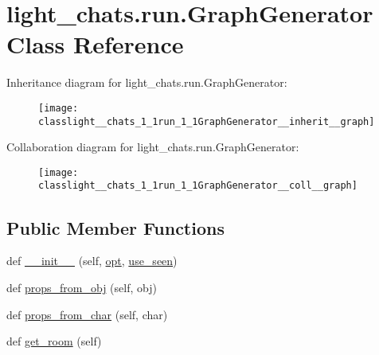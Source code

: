 \hypertarget{classlight__chats_1_1run_1_1GraphGenerator}{}\section{light\+\_\+chats.\+run.\+Graph\+Generator Class Reference}
\label{classlight__chats_1_1run_1_1GraphGenerator}


Inheritance diagram for light\+\_\+chats.\+run.\+Graph\+Generator\+:
\nopagebreak
\begin{figure}[H]
\begin{center}
\leavevmode
\texttt{[image: classlight\_\_chats\_1\_1run\_1\_1GraphGenerator\_\_inherit\_\_graph]}
\end{center}
\end{figure}


Collaboration diagram for light\+\_\+chats.\+run.\+Graph\+Generator\+:
\nopagebreak
\begin{figure}[H]
\begin{center}
\leavevmode
\texttt{[image: classlight\_\_chats\_1\_1run\_1\_1GraphGenerator\_\_coll\_\_graph]}
\end{center}
\end{figure}
\subsection*{Public Member Functions}
\begin{DoxyCompactItemize}
\item 
def \hyperlink{classlight__chats_1_1run_1_1GraphGenerator_aac2b7559d6b74c923297239c810ed53f}{\+\_\+\+\_\+init\+\_\+\+\_\+} (self, \hyperlink{classlight__chats_1_1run_1_1GraphGenerator_a3060edf4bd46a5e1a78dbc48f539d341}{opt}, \hyperlink{classlight__chats_1_1run_1_1GraphGenerator_a81da652d9cbc091fba5d410630750c39}{use\+\_\+seen})
\item 
def \hyperlink{classlight__chats_1_1run_1_1GraphGenerator_a757544b95a6b132d89a0e27dc98511f4}{props\+\_\+from\+\_\+obj} (self, obj)
\item 
def \hyperlink{classlight__chats_1_1run_1_1GraphGenerator_a3b33b3e258b5d31a586a43b484bda91c}{props\+\_\+from\+\_\+char} (self, char)
\item 
def \hyperlink{classlight__chats_1_1run_1_1GraphGenerator_aa59d2f6eb662add984d10f89d25ccab4}{get\+\_\+room} (self)
\end{DoxyCompactItemize}
